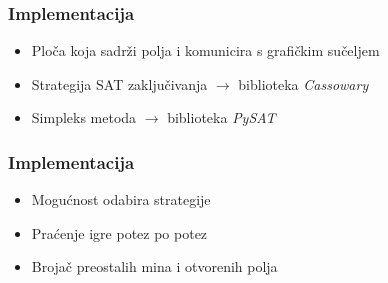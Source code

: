 \documentclass{beamer}
\begin{document}
        \begin{frame}[t]
        \frametitle{Implementacija}
        
         \begin{figure}
            \centering
        \end{figure}

      \begin{itemize}
            \item<2-> Ploča koja sadrži polja i komunicira s grafičkim sučeljem
            \item<3-> Strategija SAT zaključivanja $\rightarrow$ biblioteka \textit{Cassowary}
            \item<4-> Simpleks metoda $\rightarrow$ biblioteka \textit{PySAT}
        \end{itemize}
    \end{frame}
    
      \begin{frame}[t]
        \frametitle{Implementacija}
        
         \begin{figure}
            \centering
        \end{figure}

      \begin{itemize}
            \item<2-> Mogućnost odabira strategije
            \item<3-> Praćenje igre potez po potez
            \item<4-> Brojač preostalih mina i otvorenih polja
        \end{itemize}
    \end{frame}
\end{document}
